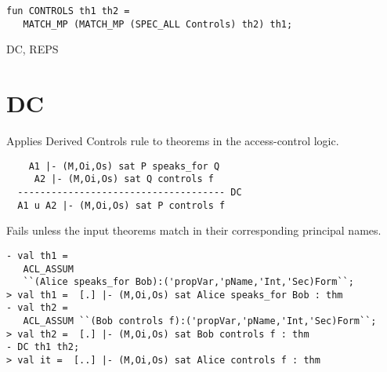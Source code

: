 \IMPLEMENTATION
\begin{holboxed}
\begin{verbatim}
fun CONTROLS th1 th2 = 
   MATCH_MP (MATCH_MP (SPEC_ALL Controls) th2) th1;
\end{verbatim}
\end{holboxed}

\SEEALSO
DC, REPS
\ENDDOC

\section{DC}



\egroup

\SYNOPSIS
Applies Derived Controls rule to theorems in the access-control logic.

\DESCRIBE
\begin{verbatim}
    A1 |- (M,Oi,Os) sat P speaks_for Q   
     A2 |- (M,Oi,Os) sat Q controls f
  ------------------------------------- DC
  A1 u A2 |- (M,Oi,Os) sat P controls f
\end{verbatim}

\FAILURE
Fails unless the input theorems match in their corresponding principal
names.

\EXAMPLE

\begin{holboxed}
\begin{verbatim}
- val th1 = 
   ACL_ASSUM 
   ``(Alice speaks_for Bob):('propVar,'pName,'Int,'Sec)Form``;
> val th1 =  [.] |- (M,Oi,Os) sat Alice speaks_for Bob : thm
- val th2 = 
   ACL_ASSUM ``(Bob controls f):('propVar,'pName,'Int,'Sec)Form``;
> val th2 =  [.] |- (M,Oi,Os) sat Bob controls f : thm
- DC th1 th2;
> val it =  [..] |- (M,Oi,Os) sat Alice controls f : thm
\end{verbatim}
\end{holboxed}

